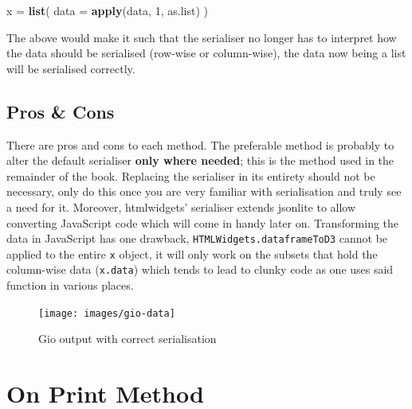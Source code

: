 \documentclass[
  10pt,
]{krantz}
\makeatletter
\newenvironment{Shaded}{\begin{snugshade}}{\end{snugshade}}
\newcommand{\DataTypeTok}[1]{\textcolor[rgb]{0.27,0.27,0.27}{#1}}
\newcommand{\DecValTok}[1]{\textcolor[rgb]{0.06,0.06,0.06}{#1}}
\newcommand{\KeywordTok}[1]{\textcolor[rgb]{0.27,0.27,0.27}{\textbf{#1}}}
\newcommand{\NormalTok}[1]{#1}
\newcommand{\StringTok}[1]{\textcolor[rgb]{0.5,0.5,0.5}{#1}}
\newenvironment{kframe}{%
\medskip{}
\setlength{\fboxsep}{.8em}
 \def\at@end@of@kframe{}%
 \ifinner\ifhmode%
  \def\at@end@of@kframe{\end{minipage}}%
  \begin{minipage}{\columnwidth}%
 \fi\fi%
 \def\FrameCommand##1{\hskip\@totalleftmargin \hskip-\fboxsep
 \colorbox{shadecolor}{##1}\hskip-\fboxsep
     \hskip-\linewidth \hskip-\@totalleftmargin \hskip\columnwidth}%
 \MakeFramed {\advance\hsize-\width
   \@totalleftmargin\z@ \linewidth\hsize
   \@setminipage}}%
 {\par\unskip\endMakeFramed%
 \at@end@of@kframe}
\renewenvironment{Shaded}{\begin{kframe}}{\end{kframe}}
\makeatother
\begin{document}
\begin{Shaded}
\begin{Highlighting}[]
\NormalTok{x =}\StringTok{ }\KeywordTok{list}\NormalTok{(}
  \DataTypeTok{data =} \KeywordTok{apply}\NormalTok{(data, }\DecValTok{1}\NormalTok{, as.list)}
\NormalTok{)}
\end{Highlighting}
\end{Shaded}

The above would make it such that the serialiser no longer has to interpret how the data should be serialised (row-wise or column-wise), the data now being a list will be serialised correctly.

\hypertarget{widgets-full-transform-data-conclusion}{%
\subsection{Pros \& Cons}\label{widgets-full-transform-data-conclusion}}

There are pros and cons to each method. The preferable method is probably to alter the default serialiser \textbf{only where needed}; this is the method used in the remainder of the book. Replacing the serialiser in its entirety should not be necessary, only do this once you are very familiar with serialisation and truly see a need for it. Moreover, htmlwidgets' serialiser extends jsonlite to allow converting JavaScript code which will come in handy later on. Transforming the data in JavaScript has one drawback, \texttt{HTMLWidgets.dataframeToD3} cannot be applied to the entire \texttt{x} object, it will only work on the subsets that hold the column-wise data (\texttt{x.data}) which tends to lead to clunky code as one uses said function in various places.

\begin{figure}[H]

{\centering \texttt{[image: images/gio-data]} 

}

\caption{Gio output with correct serialisation}\label{fig:gio-data}
\end{figure}

\hypertarget{widgets-full-on-print}{%
\section{On Print Method}\label{widgets-full-on-print}}
\end{document}
